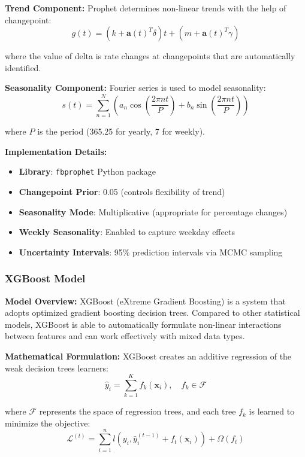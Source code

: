 \documentclass[12pt,a4paper]{article}
\begin{document}
\textbf{Trend Component:}
Prophet determines non-linear trends with the help of changepoint:
\begin{equation}
g(t) = (k + \mathbf{a}(t)^T\delta)t + (m + \mathbf{a}(t)^T\gamma)
\end{equation}

where the value of delta is rate changes at changepoints that are automatically identified.

\textbf{Seasonality Component:}
Fourier series is used to model seasonality:
\begin{equation}
s(t) = \sum_{n=1}^{N} \left( a_n \cos\left(\frac{2\pi nt}{P}\right) + b_n \sin\left(\frac{2\pi nt}{P}\right) \right)
\end{equation}

where $P$ is the period (365.25 for yearly, 7 for weekly).

\textbf{Implementation Details:}
\begin{itemize}
    \item \textbf{Library}: \texttt{fbprophet} Python package
    \item \textbf{Changepoint Prior}: 0.05 (controls flexibility of trend)
    \item \textbf{Seasonality Mode}: Multiplicative (appropriate for percentage changes)
    \item \textbf{Weekly Seasonality}: Enabled to capture weekday effects
    \item \textbf{Uncertainty Intervals}: 95\% prediction intervals via MCMC sampling
\end{itemize}

\subsubsection{XGBoost Model}

\textbf{Model Overview:}
XGBoost (eXtreme Gradient Boosting) is a system that adopts optimized gradient boosting decision trees. Compared to other statistical models, XGBoost is able to automatically formulate non-linear interactions between features and can work effectively with mixed data types.

\textbf{Mathematical Formulation:}
XGBoost creates an additive regression of the weak decision trees learners:
\begin{equation}
\hat{y}_i = \sum_{k=1}^{K} f_k(\mathbf{x}_i), \quad f_k \in \mathcal{F}
\end{equation}

where $\mathcal{F}$ represents the space of regression trees, and each tree $f_k$ is learned to minimize the objective:
\begin{equation}
\mathcal{L}^{(t)} = \sum_{i=1}^{n} l(y_i, \hat{y}_i^{(t-1)} + f_t(\mathbf{x}_i)) + \Omega(f_t)
\end{equation}
\end{document}
